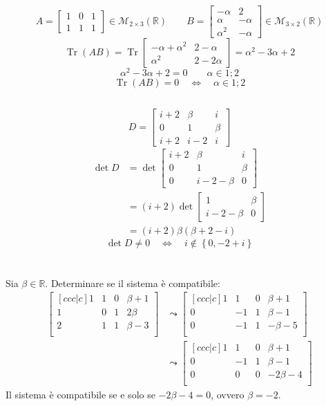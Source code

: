 \documentclass{article}
\newcommand*{\M}[3]{\mathcal{M}_{#1\times#2} \left(#3\right)}
\newcommand*{\MR}[2]{\M{#1}{#2}{\mathbb{R}}}
\newcommand*{\m}[1]{\begin{bmatrix}#1\end{bmatrix}}
\DeclareMathOperator{\Tr}{Tr}  %
\begin{document}
\subsection{}
\[
    A=\m{1&0&1\\1&1&1}\in\MR{2}{3}\qquad
    B=\m{-\alpha&2\\\alpha&-\alpha\\\alpha^2&-\alpha}\in\MR{3}{2}
\]\[
    \Tr(AB)=\Tr{\m{-\alpha+\alpha^2&2-\alpha\\
    \alpha^2&2-2\alpha}}=\alpha^2-3\alpha+2
\]
\[\alpha^2-3\alpha+2=0\qquad \alpha\in{1;2}\]
\[\Tr(AB)=0\quad\Leftrightarrow\quad\alpha\in{1;2}\]

\subsection{}
\[D=\m{i+2&\beta&i\\0&1&\beta\\i+2&i-2&i}\]
\[\begin{aligned}
    \det{D} &=
    \det\m{i+2&\beta&i\\0&1&\beta\\0&i-2-\beta&0} \\&=
    (i+2)\det\m{1&\beta\\i-2-\beta&0} \\&=
    (i+2)\beta(\beta+2-i)
\end{aligned}\]
\[
    \det{D}\ne0\quad\Leftrightarrow\quad
    i\notin\left\{ 0,-2+i \right\}
\]

\section{}
\subsection{}
Sia $\beta\in\mathbb{R}$. Determinare se il sistema è
compatibile:
\[\begin{aligned}\m{[ccc|c]
    1&1&0&\beta+1\\
    1&0&1&2\beta\\
    2&1&1&\beta-3\\
}&\leadsto\m{[ccc|c]
    1&1&0&\beta+1\\
    0&-1&1&\beta-1\\
    0&-1&1&-\beta-5\\
}\\&\leadsto\m{[ccc|c]
    1&1&0&\beta+1\\
    0&-1&1&\beta-1\\
    0&0&0&-2\beta-4\\
}
\end{aligned}\]
Il sistema è compatibile se e solo se $-2\beta-4=0$,
ovvero $\beta=-2$.
\end{document}
